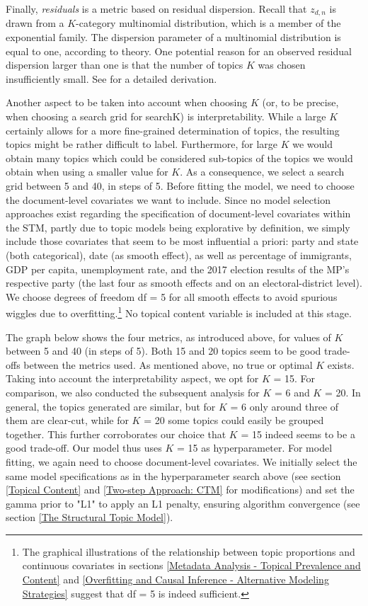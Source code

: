 Finally, \textit{residuals} is a metric based on residual dispersion. Recall that $z_{d,n}$ is drawn from a $K$-category multinomial distribution, which is a member of the exponential family. The dispersion parameter of a multinomial distribution is equal to one, according to theory. One potential reason for an observed residual dispersion larger than one is that the number of topics $K$ was chosen insufficiently small. See \cite{taddy2012estimation} for a detailed derivation.

Another aspect to be taken into account when choosing $K$ (or, to be precise, when choosing a search grid for searchK) is interpretability. While a large $K$ certainly allows for a more fine-grained determination of topics, the resulting topics might be rather difficult to label. Furthermore, for large $K$ we would obtain many topics which could be considered sub-topics of the topics we would obtain when using a smaller value for $K$. As a consequence, we select a search grid between 5 and 40, in steps of 5. Before fitting the model, we need to choose the document-level covariates we want to include. Since no model selection approaches exist regarding the specification of document-level covariates within the STM, partly due to topic models being explorative by definition, we simply include those covariates that seem to be most influential a priori: party and state (both categorical), date (as smooth effect), as well as percentage of immigrants, GDP per capita, unemployment rate, and the 2017 election results of the MP's respective party (the last four as smooth effects and on an electoral-district level). We choose degrees of freedom df = 5 for all smooth effects to avoid spurious wiggles due to overfitting.\footnote{The graphical illustrations of the relationship between topic proportions and continuous covariates in sections \ref{Metadata Analysis - Topical Prevalence and Content} and \ref{Overfitting and Causal Inference - Alternative Modeling Strategies} suggest that df = 5 is indeed sufficient.} No topical content variable is included at this stage.

The graph below shows the four metrics, as introduced above, for values of $K$ between 5 and 40 (in steps of 5). Both 15 and 20 topics seem to be good trade-offs between the metrics used. As mentioned above, no true or optimal $K$ exists. Taking into account the interpretability aspect, we opt for $K$ = 15. For comparison, we also conducted the subsequent analysis for $K$ = 6 and $K$ = 20. In general, the topics generated are similar, but for $K$ = 6 only around three of them are clear-cut, while for $K$ = 20 some topics could easily be grouped together. This further corroborates our choice that $K$ = 15 indeed seems to be a good trade-off. Our model thus uses $K$ = 15 as hyperparameter. For model fitting, we again need to choose document-level covariates. We initially select the same model specifications as in the hyperparameter search above (see section \ref{Topical Content} and \ref{Two-step Approach: CTM} for modifications) and set the gamma prior to "L1" to apply an L1 penalty, ensuring algorithm convergence (see section \ref{The Structural Topic Model}).

